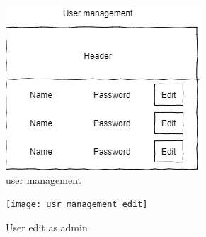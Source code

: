 \documentclass{article}
\begin{document}
\begin{figure}[!h]
    \centering
    \includegraphics{user_management}
    \caption{user management}
    \label{fig:user management}
\end{figure}

\begin{figure}[!h]
    \centering
    \texttt{[image: usr\_management\_edit]}
    \caption{User edit as admin}
    \label{fig:usr_management_edit}
\end{figure}
\end{document}
